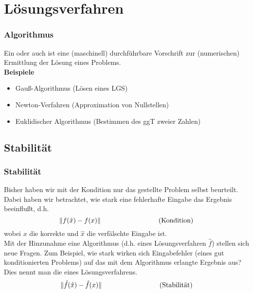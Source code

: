 \section{Lösungsverfahren}
\makeSectionDividerPage
%
\begin{frame}\frametitle{Algorithmus}
Ein  oder auch  ist eine (maschinell) durchführbare Vorschrift zur (numerischen) Ermittlung der Lösung eines Problems.\\ \pause \vfill
\textbf{Beispiele}\\
\begin{itemize}
\item Gauß-Algorithmus (Lösen eines LGS)
\item Newton-Verfahren (Approximation von Nullstellen)
\item Euklidischer Algorithmus (Bestimmen des ggT zweier Zahlen)
\end{itemize}
\end{frame}
%
\subsection{Stabilität}
%
\begin{frame}\frametitle{Stabilität}
Bisher haben wir mit der Kondition nur das gestellte Problem selbst beurteilt. Dabei haben wir betrachtet, wie stark eine fehlerhafte Eingabe das Ergebnis beeinflußt, d.h.
$$
\|f(\hat x)-f(x)\| \hspace{30mm} \text{(Kondition)}
$$ 
wobei $x$ die korrekte und $\hat x$ die verfälschte Eingabe ist.\\ \pause \vfill
Mit der Hinzunahme eine Algorithmus (d.h. eines Lösungsverfahren $\hat f$) stellen sich neue Fragen. Zum Beispiel, wie stark wirken sich Eingabefehler (eines gut konditionierten Problems) auf das mit dem Algorithmus erlangte Ergebnis aus? Dies nennt man die  eines Lösungsverfahrens.
$$
\|\hat f(\hat x)-\hat f( x)\| \hspace{30mm} \text{(Stabilität)}
$$
	
	
\end{frame}
%
%
